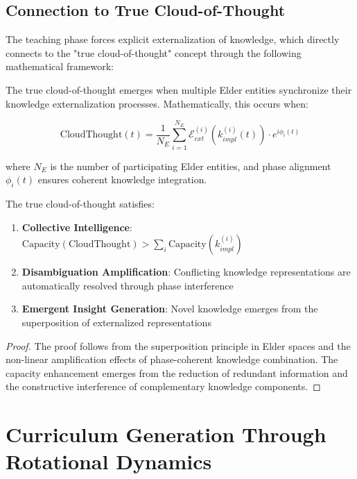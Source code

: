 \subsection{Connection to True Cloud-of-Thought}

The teaching phase forces explicit externalization of knowledge, which directly connects to the "true cloud-of-thought" concept through the following mathematical framework:

\begin{theorem}
\label{thm:true_cloud_thought}
The true cloud-of-thought emerges when multiple Elder entities synchronize their knowledge externalization processes. Mathematically, this occurs when:

\begin{equation}
\text{CloudThought}(t) = \frac{1}{N_E} \sum_{i=1}^{N_E} \mathcal{E}_{ext}^{(i)}(k_{impl}^{(i)}(t)) \cdot e^{i\phi_i(t)}
\end{equation}

where $N_E$ is the number of participating Elder entities, and phase alignment $\phi_i(t)$ ensures coherent knowledge integration.

The true cloud-of-thought satisfies:
\begin{enumerate}
    \item \textbf{Collective Intelligence}: $\text{Capacity}(\text{CloudThought}) > \sum_i \text{Capacity}(k_{impl}^{(i)})$
    \item \textbf{Disambiguation Amplification}: Conflicting knowledge representations are automatically resolved through phase interference
    \item \textbf{Emergent Insight Generation}: Novel knowledge emerges from the superposition of externalized representations
\end{enumerate}
\end{theorem}

\begin{proof}
The proof follows from the superposition principle in Elder spaces and the non-linear amplification effects of phase-coherent knowledge combination. The capacity enhancement emerges from the reduction of redundant information and the constructive interference of complementary knowledge components.
\end{proof}

\section{Curriculum Generation Through Rotational Dynamics}

